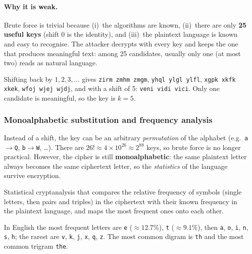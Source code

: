 \paragraph{Why it is weak.} Brute force is trivial because (i)~the algorithms are known, (ii)~there are only \textbf{25 useful keys} (shift 0 is the identity), and (iii)~the plaintext language is known and easy to recognise. The attacker decrypts with every key and keeps the one that produces meaningful text: among 25 candidates, usually only one (at most two) reads as natural language.

\begin{example}
Shifting back by $1,2,3,\dots$ gives \texttt{zirm zmhm zmgm}, \texttt{yhql ylgl ylfl}, \texttt{xgpk xkfk xkek}, \texttt{wfoj wjej wjdj}, and with a shift of 5: \texttt{veni vidi vici}. Only one candidate is meaningful, so the key is $k=5$.
\end{example}

\subsubsection{Monoalphabetic substitution and frequency analysis}

Instead of a shift, the key can be an arbitrary \emph{permutation} of the alphabet (e.g.\ \texttt{a}$\to$\texttt{Q}, \texttt{b}$\to$\texttt{W}, \dots). There are $26! \approx 4 \times 10^{26} \approx 2^{88}$ keys, so brute force is no longer practical. However, the cipher is still \textbf{monoalphabetic}: the same plaintext letter always becomes the same ciphertext letter, so the \emph{statistics} of the language survive encryption.

\begin{definition}
Statistical cryptanalysis that compares the relative frequency of symbols (single letters, then pairs and triples) in the ciphertext with their known frequency in the plaintext language, and maps the most frequent ones onto each other.
\end{definition}

In English the most frequent letters are \texttt{e} ($\approx 12.7\%$), \texttt{t} ($\approx 9.1\%$), then \texttt{a}, \texttt{o}, \texttt{i}, \texttt{n}, \texttt{s}, \texttt{h}; the rarest are \texttt{v}, \texttt{k}, \texttt{j}, \texttt{x}, \texttt{q}, \texttt{z}. The most common digram is \texttt{th} and the most common trigram \texttt{the}.

